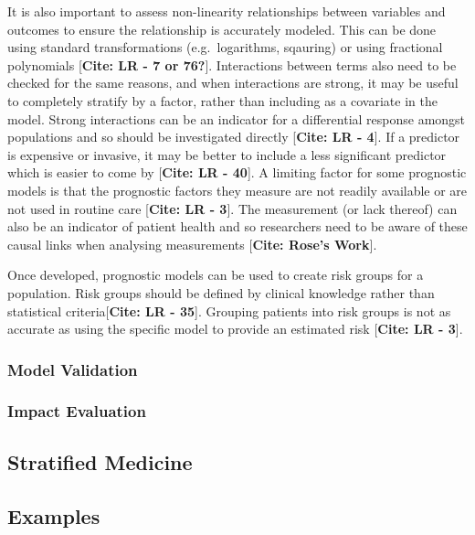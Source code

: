 \documentclass[
]{article}
\begin{document}
It is also important to assess non-linearity relationships between variables and outcomes to ensure the relationship is accurately modeled. This can be done using standard transformations (e.g.~logarithms, sqauring) or using fractional polynomials {[}\textbf{Cite: LR - 7 or 76?}{]}. Interactions between terms also need to be checked for the same reasons, and when interactions are strong, it may be useful to completely stratify by a factor, rather than including as a covariate in the model. Strong interactions can be an indicator for a differential response amongst populations and so should be investigated directly {[}\textbf{Cite: LR - 4}{]}. If a predictor is expensive or invasive, it may be better to include a less significant predictor which is easier to come by {[}\textbf{Cite: LR - 40}{]}. A limiting factor for some prognostic models is that the prognostic factors they measure are not readily available or are not used in routine care {[}\textbf{Cite: LR - 3}{]}. The measurement (or lack thereof) can also be an indicator of patient health and so researchers need to be aware of these causal links when analysing measurements {[}\textbf{Cite: Rose's Work}{]}.

Once developed, prognostic models can be used to create risk groups for a population. Risk groups should be defined by clinical knowledge rather than statistical criteria{[}\textbf{Cite: LR - 35}{]}. Grouping patients into risk groups is not as accurate as using the specific model to provide an estimated risk {[}\textbf{Cite: LR - 3}{]}.

\hypertarget{model-validation}{%
\subsubsection{Model Validation}\label{model-validation}}

\hypertarget{impact-evaluation}{%
\subsubsection{Impact Evaluation}\label{impact-evaluation}}

\hypertarget{stratified-medicine}{%
\subsection{Stratified Medicine}\label{stratified-medicine}}

\hypertarget{examples}{%
\subsection{Examples}\label{examples}}
\end{document}
